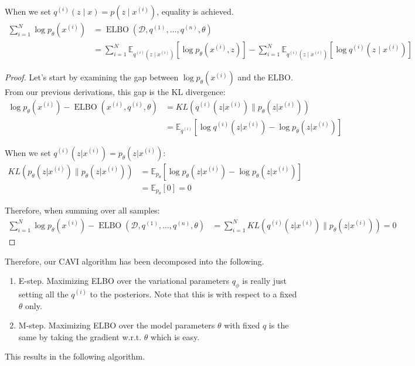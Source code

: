 \documentclass{article}
\DeclareMathOperator{\elbo}{ELBO}
\begin{document}
  \begin{theorem}
    \label{thm:posterior-maximizes-elbo}
 
    When we set $q^(i) (z \mid x) = p(z \mid x^{(i)})$, equality is achieved. 
    \begin{align}
      \sum_{i=1}^N \log p_{\theta} (x^{(i)}) & = \elbo(\mathcal{D}, q^{(1)}, \ldots, q^{(n)}, \theta) \\ 
                                             & = \sum_{i=1}^N \mathbb{E}_{q^{(i)} (z \mid x^{(i)})} [ \log p_{\theta} (x^{(i)}, z)] - \sum_{i=1}^N \mathbb{E}_{q^{(i)} (z \mid x^{(i)})} [ \log q^{(i)} (z \mid x^{(i)}) ]
    \end{align}
  \end{theorem}
  \begin{proof}
    Let's start by examining the gap between $\log p_\theta(x^{(i)})$ and the ELBO. From our previous derivations, this gap is the KL divergence:
    \begin{align}
      \log p_\theta(x^{(i)}) - \elbo(x^{(i)}, q^{(i)}, \theta) &= KL(q^{(i)}(z|x^{(i)}) \| p_\theta(z|x^{(i)})) \\
      &= \mathbb{E}_{q^{(i)}}[\log q^{(i)}(z|x^{(i)}) - \log p_\theta(z|x^{(i)})]
    \end{align}

    When we set $q^{(i)}(z|x^{(i)}) = p_\theta(z|x^{(i)})$:
    \begin{align}
      KL(p_\theta(z|x^{(i)}) \| p_\theta(z|x^{(i)})) &= \mathbb{E}_{p_\theta}[\log p_\theta(z|x^{(i)}) - \log p_\theta(z|x^{(i)})] \\
      &= \mathbb{E}_{p_\theta}[0] = 0
    \end{align}

    Therefore, when summing over all samples:
    \begin{align}
      \sum_{i=1}^N \log p_\theta(x^{(i)}) - \elbo(\mathcal{D}, q^{(1)}, \ldots, q^{(n)}, \theta) &= \sum_{i=1}^N KL(q^{(i)}(z|x^{(i)}) \| p_\theta(z|x^{(i)})) = 0
    \end{align}
  \end{proof} 

  Therefore, our CAVI algorithm has been decomposed into the following. 
  \begin{enumerate}
    \item E-step. Maximizing ELBO over the variational parameters $q_\phi$ is really just setting all the $q^{(i)}$ to the posteriors. Note that this is with respect to a fixed $\theta$ only. 
    \item M-step. Maximizing ELBO over the model parameters $\theta$ with fixed $q$ is the same by taking the gradient w.r.t. $\theta$ which is easy. 
  \end{enumerate}
  This results in the following algorithm. 
\end{document}
